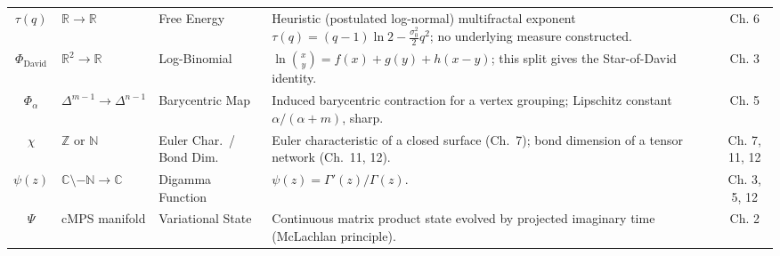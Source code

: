 \documentclass[11pt,a4paper,oneside]{article}
\begin{document}
\begin{table}[!htbp]
\begin{tabularx}{\textwidth}{@{} c p{3.0cm} p{2.6cm} X c @{}}
$\tau(q)$ & $\mathbb{R} \to \mathbb{R}$ & Free Energy & Heuristic (postulated log-normal) multifractal exponent $\tau(q) = (q-1)\ln 2 - \frac{\sigma_0^2}{2}q^2$; no underlying measure constructed. & Ch. 6 \\
$\Phi_{\mathrm{David}}$ & $\mathbb{R}^2 \to \mathbb{R}$ & Log-Binomial & $\ln\binom{x}{y} = f(x) + g(y) + h(x-y)$; this split gives the Star-of-David identity. & Ch. 3 \\
$\Phi_\alpha$ & $\Delta^{m-1} \to \Delta^{n-1}$ & Barycentric Map & Induced barycentric contraction for a vertex grouping; Lipschitz constant $\alpha/(\alpha+m)$, sharp. & Ch. 5 \\
$\chi$ & $\mathbb{Z}$ or $\mathbb{N}$ & Euler Char.\ / Bond Dim. & Euler characteristic of a closed surface (Ch.~7); bond dimension of a tensor network (Ch.~11, 12). & Ch. 7, 11, 12 \\
$\psi(z)$ & $\mathbb{C} \setminus -\mathbb{N} \to \mathbb{C}$ & Digamma Function & $\psi(z) = \Gamma'(z)/\Gamma(z)$. & Ch. 3, 5, 12 \\
$\Psi$ & cMPS manifold & Variational State & Continuous matrix product state evolved by projected imaginary time (McLachlan principle). & Ch. 2 \\
\bottomrule
\end{tabularx}
\end{table}

\clearpage
\end{document}
